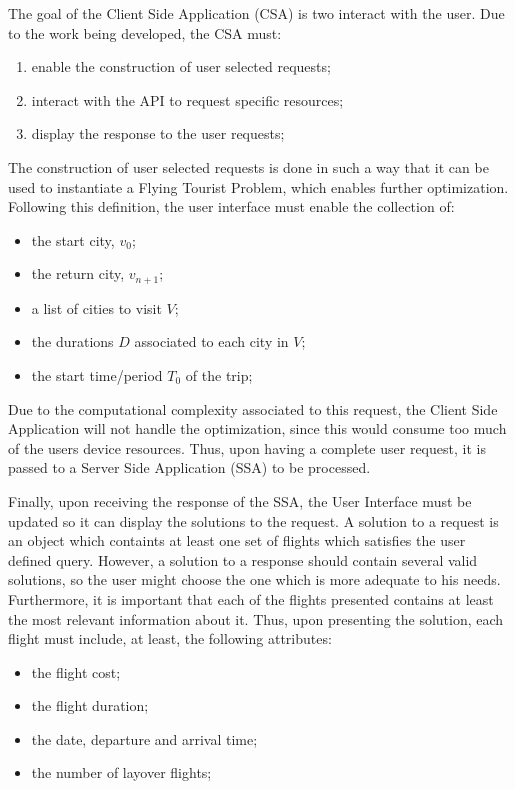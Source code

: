 The goal of the Client Side Application (CSA) is two interact with the user.
Due to the work being developed, the CSA must:

\begin{enumerate}[noitemsep,topsep=0pt,parsep=0pt,partopsep=0pt]
  \item enable the construction of user selected requests;
  \item interact with the API to request specific resources;
  \item display the response to the user requests;
\end{enumerate}

The construction of user selected requests is done in such a way 
that it can be used to instantiate a Flying Tourist Problem,
which enables further optimization.
Following this definition, the user interface must enable the collection of:

\begin{itemize}[noitemsep,topsep=0pt,parsep=0pt,partopsep=0pt]
  \item the start city, $v_{0}$;
  \item the return city, $v_{n+1}$;
  \item a list of cities to visit $V$;
  \item the durations $D$ associated to each city in $V$;
  \item the start time/period $T_{0}$ of the trip;
\end{itemize}

Due to the computational complexity associated to this request,
the Client Side Application will not handle the optimization,
since this would consume too much of the users device resources.
Thus, upon having a complete user request, it is passed to a 
Server Side Application (SSA) to be processed.

Finally, upon receiving the response of the SSA, 
the User Interface must be updated so it can display the solutions to the request.
A solution to a request is an object which containts at least one set of flights which 
satisfies the user defined query. However, a solution to a response should 
contain several valid solutions, so the user might choose the one which is more adequate to his needs.
Furthermore, it is important that each of the flights presented contains at least the most relevant information about it.
Thus, upon presenting the solution, each flight must include, at least, the following attributes:

\begin{itemize}[noitemsep,topsep=0pt,parsep=0pt,partopsep=0pt]
  \item the flight cost;
  \item the flight duration;
  \item the date, departure and arrival time;
  \item the number of layover flights;
\end{itemize}

